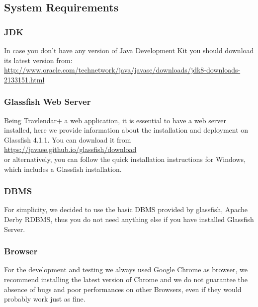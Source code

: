\subsection{System Requirements}

\subsubsection{JDK}
In case you don't have any version of Java Development Kit you should download its latest version from:
\\
\href{url}{http://www.oracle.com/technetwork/java/javase/downloads/jdk8-downloads-2133151.html}

\subsubsection{Glassfish Web Server}
Being Travlendar+ a web application, it is essential to have a web server installed, here we provide information about the installation and deployment on Glassfish 4.1.1. You can download it from
\\
\href{url}{https://javaee.github.io/glassfish/download}
\\or alternatively, you can follow the quick installation instructions for Windows, which includes a Glassfish installation.

\subsubsection{DBMS}
For simplicity, we decided to use the basic DBMS provided by glassfish, Apache Derby RDBMS, thus you do not need anything else if you have installed Glassfish Server.

\subsubsection{Browser}
For the development and testing we always used Google Chrome as browser, we recommend installing the latest version of Chrome and we do not guarantee the absence of bugs and poor performances on other Browsers, even if they would probably work just as fine.

